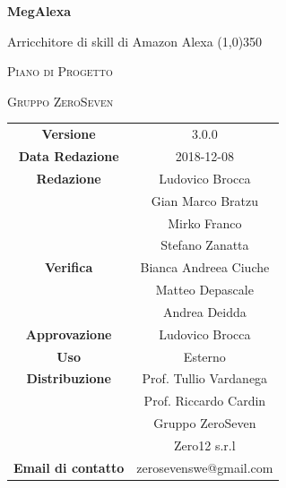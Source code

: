 \documentclass[a4paper,12pt, openany]{book}
\author{Mirko Franco}
\date{2018-11-26}
\begin{document}
\begin{titlepage}
	\centering
	{\huge\bfseries MegAlexa\par}
	Arricchitore di skill di Amazon Alexa
	\line(1,0){350} \\
	{\scshape\LARGE Piano di Progetto \par}
	\vspace{1cm}
	{\scshape Gruppo ZeroSeven \par}
	\logo
	\begin{tabular}{c|c}
		{\hfill \textbf{Versione}} 			& 3.0.0    \\
		{\hfill\textbf{Data Redazione}} 	& 2018-12-08\\ 
		{\hfill\textbf{Redazione}} 			&Ludovico Brocca\\ & Gian Marco Bratzu\\ &Mirko Franco\\&Stefano Zanatta\\
		{\hfill\textbf{Verifica}} 		&  	Bianca Andreea Ciuche \\& Matteo Depascale\\ &Andrea Deidda\\
		{\hfill\textbf{Approvazione}} 		&  		Ludovico Brocca	\\ 
		{\hfill\textbf{Uso}} 					& 		Esterno		\\ 
		{\hfill\textbf{Distribuzione}} 			& 			Prof. Tullio Vardanega \\ & Prof. Riccardo Cardin \\ & Gruppo ZeroSeven		\\ & Zero12 s.r.l \\ 
		{\hfill\textbf{Email di contatto}} & zerosevenswe@gmail.com \\
	\end{tabular}
\end{titlepage}
	\label{LastFrontPage}
	\newpage	
	
	\pagestyle{mymain}
	\tableofcontents
	\listoftables
	\listoffigures
	
	
	
	
	
	\begin{appendices}
		
		
	\end{appendices}
	\label{LastPage}
\end{document}
